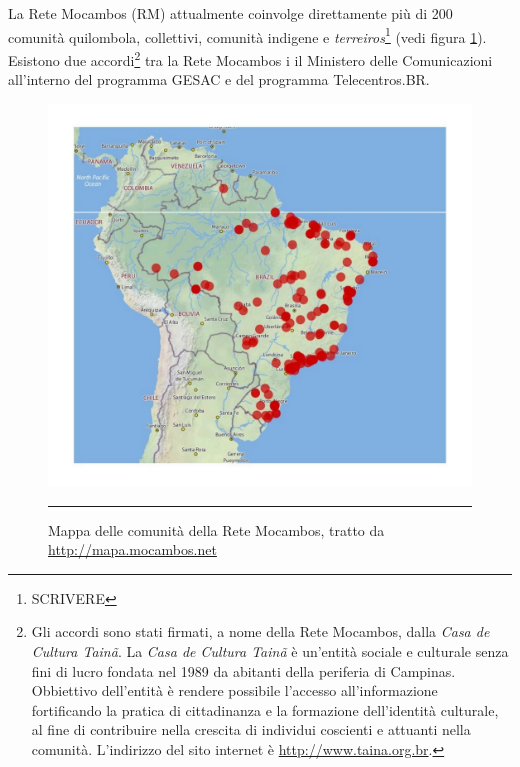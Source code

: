 La Rete Mocambos (RM) attualmente coinvolge direttamente più di 200
comunità quilombola, collettivi, comunità indigene e
\emph{terreiros}\footnote{SCRIVERE} (vedi figura
\ref{fig:MappaRedeMocambos}). Esistono due accordi\footnote{Gli
  accordi sono stati firmati, a nome della Rete Mocambos, dalla
  \emph{Casa de Cultura Tainã}. La \emph{Casa de Cultura Tainã} è
  un'entità sociale e culturale senza fini di lucro fondata nel 1989
  da abitanti della periferia di Campinas. Obbiettivo dell'entità è
  rendere possibile l'accesso all'informazione fortificando la pratica
  di cittadinanza e la formazione dell'identità culturale, al fine di
  contribuire nella crescita di individui coscienti e attuanti nella
  comunità. L'indirizzo del sito internet è
  \url{http://www.taina.org.br}.} tra la Rete Mocambos i il Ministero
delle Comunicazioni all'interno del programma GESAC e del programma
Telecentros.BR. 

\begin{figure}[htbp]
  \centering
  \includegraphics[width=\textwidth]{./Figure/MappaRedeMocambos.pdf}
  \rule{35em}{0.5pt}
  \caption[Mappa delle comunità della Rete Mocambos, tratto da
  \url{http://mapa.mocambos.net}]{Mappa delle comunità della Rete
    Mocambos, tratto da \url{http://mapa.mocambos.net}}
  \label{fig:MappaRedeMocambos}
\end{figure}

